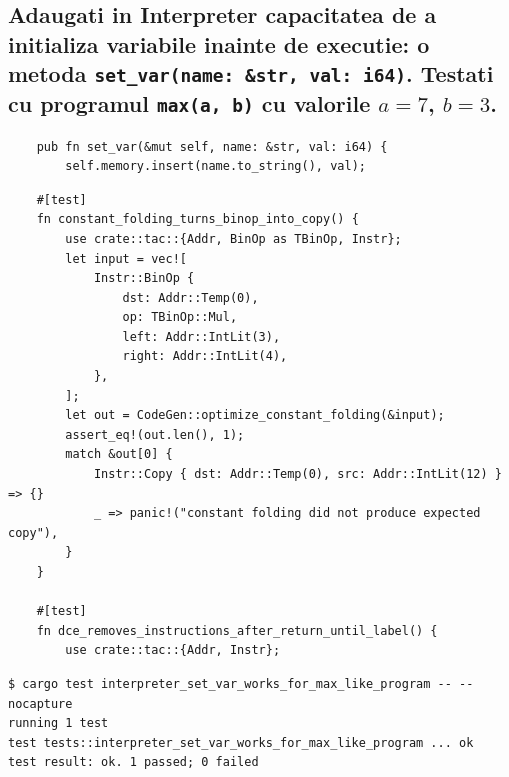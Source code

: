 \documentclass[11pt]{article}
\begin{document}
\subsection{Adaugati in Interpreter capacitatea de a initializa variabile inainte de executie: o metoda \texttt{set\_var(name: \&str, val: i64)}. Testati cu programul \texttt{max(a, b)} cu valorile \(a=7\), \(b=3\).}
\label{sec:orge31e161}
\begin{verbatim}
    pub fn set_var(&mut self, name: &str, val: i64) {
        self.memory.insert(name.to_string(), val);
\end{verbatim}
\begin{verbatim}
    #[test]
    fn constant_folding_turns_binop_into_copy() {
        use crate::tac::{Addr, BinOp as TBinOp, Instr};
        let input = vec![
            Instr::BinOp {
                dst: Addr::Temp(0),
                op: TBinOp::Mul,
                left: Addr::IntLit(3),
                right: Addr::IntLit(4),
            },
        ];
        let out = CodeGen::optimize_constant_folding(&input);
        assert_eq!(out.len(), 1);
        match &out[0] {
            Instr::Copy { dst: Addr::Temp(0), src: Addr::IntLit(12) } => {}
            _ => panic!("constant folding did not produce expected copy"),
        }
    }

    #[test]
    fn dce_removes_instructions_after_return_until_label() {
        use crate::tac::{Addr, Instr};
\end{verbatim}
\begin{verbatim}
$ cargo test interpreter_set_var_works_for_max_like_program -- --nocapture
running 1 test
test tests::interpreter_set_var_works_for_max_like_program ... ok
test result: ok. 1 passed; 0 failed
\end{verbatim}
\end{document}
